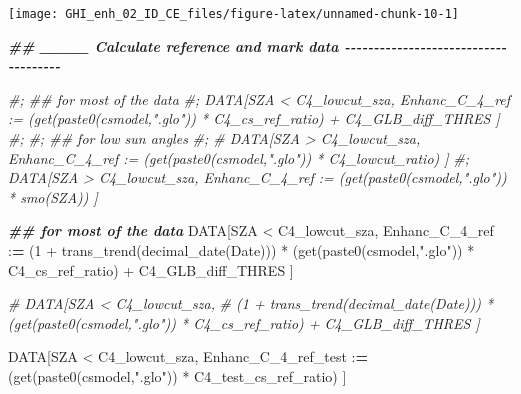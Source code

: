\documentclass[
  10pt,
  a4paper,oneside]{article}
\newenvironment{Shaded}{\begin{snugshade}}{\end{snugshade}}
\newcommand{\AttributeTok}[1]{\textcolor[rgb]{0.77,0.63,0.00}{#1}}
\newcommand{\CommentTok}[1]{\textcolor[rgb]{0.56,0.35,0.01}{\textit{#1}}}
\newcommand{\DecValTok}[1]{\textcolor[rgb]{0.00,0.00,0.81}{#1}}
\newcommand{\DocumentationTok}[1]{\textcolor[rgb]{0.56,0.35,0.01}{\textbf{\textit{#1}}}}
\newcommand{\ErrorTok}[1]{\textcolor[rgb]{0.64,0.00,0.00}{\textbf{#1}}}
\newcommand{\FunctionTok}[1]{\textcolor[rgb]{0.00,0.00,0.00}{#1}}
\newcommand{\NormalTok}[1]{#1}
\newcommand{\SpecialCharTok}[1]{\textcolor[rgb]{0.00,0.00,0.00}{#1}}
\newcommand{\StringTok}[1]{\textcolor[rgb]{0.31,0.60,0.02}{#1}}
\begin{document}
\begin{Shaded}
\end{Shaded}

\begin{center}\texttt{[image: GHI\_enh\_02\_ID\_CE\_files/figure-latex/unnamed-chunk-10-1]} \end{center}

\begin{Shaded}
\begin{Highlighting}[]
\DocumentationTok{\#\# \_\_\_\_ Calculate reference and mark data  {-}{-}{-}{-}{-}{-}{-}{-}{-}{-}{-}{-}{-}{-}{-}{-}{-}{-}{-}{-}{-}{-}{-}{-}{-}{-}{-}{-}{-}{-}{-}{-}{-}{-}{-}{-}{-}}

\CommentTok{\#; \#\# for most of the data}
\CommentTok{\#; DATA[SZA \textless{} C4\_lowcut\_sza, Enhanc\_C\_4\_ref := (get(paste0(csmodel,".glo")) * C4\_cs\_ref\_ratio) + C4\_GLB\_diff\_THRES ]}
\CommentTok{\#;}
\CommentTok{\#; \#\# for low sun angles}
\CommentTok{\#; \# DATA[SZA \textgreater{} C4\_lowcut\_sza, Enhanc\_C\_4\_ref := (get(paste0(csmodel,".glo")) * C4\_lowcut\_ratio) ]}
\CommentTok{\#; DATA[SZA \textgreater{} C4\_lowcut\_sza, Enhanc\_C\_4\_ref := (get(paste0(csmodel,".glo")) * smo(SZA)) ]}


\DocumentationTok{\#\# for most of the data}
\NormalTok{DATA[SZA }\SpecialCharTok{\textless{}}\NormalTok{ C4\_lowcut\_sza,}
\NormalTok{     Enhanc\_C\_4\_ref }\SpecialCharTok{:}\ErrorTok{=}
\NormalTok{       (}\DecValTok{1} \SpecialCharTok{+} \FunctionTok{trans\_trend}\NormalTok{(}\FunctionTok{decimal\_date}\NormalTok{(Date))) }\SpecialCharTok{*}\NormalTok{ (}\FunctionTok{get}\NormalTok{(}\FunctionTok{paste0}\NormalTok{(csmodel,}\StringTok{".glo"}\NormalTok{)) }\SpecialCharTok{*}\NormalTok{ C4\_cs\_ref\_ratio) }\SpecialCharTok{+}\NormalTok{ C4\_GLB\_diff\_THRES ]}

\CommentTok{\# DATA[SZA \textless{} C4\_lowcut\_sza,}
\CommentTok{\#       (1 + trans\_trend(decimal\_date(Date))) * (get(paste0(csmodel,".glo")) * C4\_cs\_ref\_ratio) + C4\_GLB\_diff\_THRES ]}

\NormalTok{DATA[SZA }\SpecialCharTok{\textless{}}\NormalTok{ C4\_lowcut\_sza,}
\NormalTok{     Enhanc\_C\_4\_ref\_test }\SpecialCharTok{:}\ErrorTok{=}\NormalTok{                                    (}\FunctionTok{get}\NormalTok{(}\FunctionTok{paste0}\NormalTok{(csmodel,}\StringTok{".glo"}\NormalTok{)) }\SpecialCharTok{*}\NormalTok{ C4\_test\_cs\_ref\_ratio) ]}


\end{Highlighting}
\end{Shaded}
\end{document}
